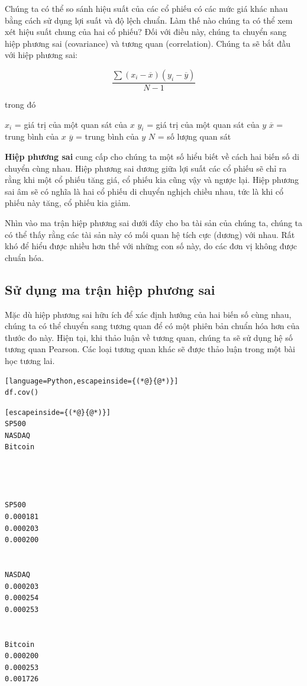 Chúng ta có thể so sánh hiệu suất của các cổ phiếu có các mức giá khác nhau bằng cách sử dụng lợi suất và độ lệch chuẩn. Làm thế nào chúng ta có thể xem xét hiệu suất chung của hai cổ phiếu? Đối với điều này, chúng ta chuyển sang hiệp phương sai (covariance) và tương quan (correlation). Chúng ta sẽ bắt đầu với hiệp phương sai:

\[\frac{\sum(x_{i}-\overline{x})(y_{i}-\overline{y})}{N-1}\]

trong đó

$x_i$ = giá trị của một quan sát của $x$ $y_i$ = giá trị của một quan sát của $y$ $\overline{x}$ = trung bình của $x$ $\overline{y}$ = trung bình của $y$ $N$ = số lượng quan sát

\textbf{Hiệp phương sai} cung cấp cho chúng ta một số hiểu biết về cách hai biến số di chuyển cùng nhau. Hiệp phương sai dương giữa lợi suất các cổ phiếu sẽ chỉ ra rằng khi một cổ phiếu tăng giá, cổ phiếu kia cũng vậy và ngược lại. Hiệp phương sai âm sẽ có nghĩa là hai cổ phiếu di chuyển nghịch chiều nhau, tức là khi cổ phiếu này tăng, cổ phiếu kia giảm.

Nhìn vào ma trận hiệp phương sai dưới đây cho ba tài sản của chúng ta, chúng ta có thể thấy rằng các tài sản này có mối quan hệ tích cực (dương) với nhau. Rất khó để hiểu được nhiều hơn thế với những con số này, do các đơn vị không được chuẩn hóa.

\subsection{Sử dụng ma trận hiệp phương sai}

Mặc dù hiệp phương sai hữu ích để xác định hướng của hai biến số cùng nhau, chúng ta có thể chuyển sang tương quan để có một phiên bản chuẩn hóa hơn của thước đo này. Hiện tại, khi thảo luận về tương quan, chúng ta sẽ sử dụng hệ số tương quan Pearson. Các loại tương quan khác sẽ được thảo luận trong một bài học tương lai.

\begin{lstlisting}[language=Python,escapeinside={(*@}{@*)}]
df.cov()
\end{lstlisting}

\begin{lstlisting}[escapeinside={(*@}{@*)}]
SP500
NASDAQ
Bitcoin




SP500
0.000181
0.000203
0.000200


NASDAQ
0.000203
0.000254
0.000253


Bitcoin
0.000200
0.000253
0.001726
\end{lstlisting}


